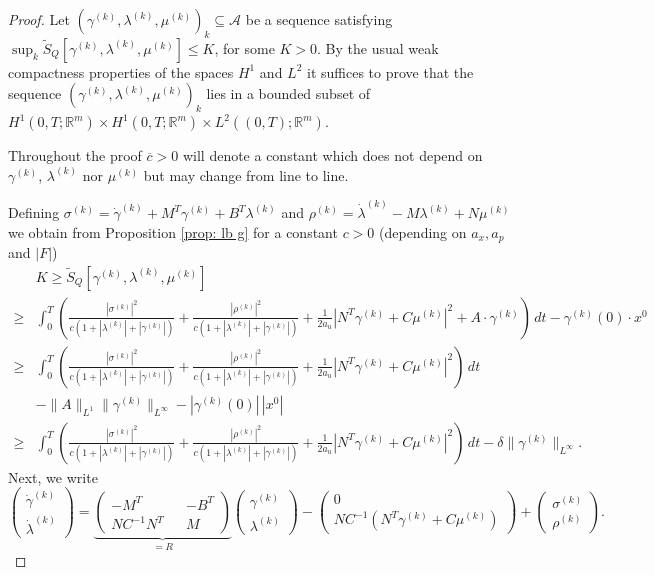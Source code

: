 \documentclass[11pt]{article}
\newcommand{\R}{\mathbb R}
\begin{document}
\begin{proof}
Let $(\gamma^{(k)},\lambda^{(k)}, \mu^{(k)})_k \subseteq \mathcal{A}$ be a sequence satisfying $\sup_k \tilde{S}_Q[\gamma^{(k)},\lambda^{(k)}, \mu^{(k)}] \leq K$, for some $K>0$.
By the usual weak compactness properties of the spaces $H^1$ and $L^2$ it suffices to prove that the sequence $(\gamma^{(k)},\lambda^{(k)}, \mu^{(k)})_k$ lies in a bounded subset of $H^1(0,T; \R^m) \times H^1(0,T; \R^m) \times L^2((0,T); \R^m)$.

Throughout the proof $\overline{c}>0$ will denote a constant which does not depend on $\gamma^{(k)}$, $\lambda^{(k)}$ nor $\mu^{(k)}$ but may change from line to line.

Defining $\sigma^{(k)} = \dot{\gamma}^{(k)} + M^T\gamma^{(k)} + B^T \lambda^{(k)}$ and $\rho^{(k)} = \dot{\lambda}^{(k)} - M \lambda^{(k)}  + N \mu^{(k)}$ we obtain from Proposition \ref{prop: lb g} for a constant $c>0$ (depending on $a_x, a_p$ and $|F|$)
\begin{align}
&K \geq \tilde{S}_Q[\gamma^{(k)},\lambda^{(k)}, \mu^{(k)}]  \label{eq: est coer dual} \\
\geq &\int_0^T \left( \frac{|\sigma^{(k)}|^2}{c(1 + |\lambda^{(k)}| + |\gamma^{(k)}|)} + \frac{|\rho^{(k)} |^2}{c(1 + |\lambda^{(k)}| + |\gamma^{(k)}|)} + \frac1{2a_u} |N^T\gamma^{(k)} + C \mu^{(k)}|^2 + A\cdot \gamma^{(k)} \right)  \, dt - \gamma^{(k)}(0)\cdot x^0 \nonumber \\
\geq &\int_0^T \left( \frac{|\sigma^{(k)}|^2}{c(1 + |\lambda^{(k)}| +  |\gamma^{(k)}|)} + \frac{|\rho^{(k)} |^2}{c(1 + |\lambda^{(k)}| + |\gamma^{(k)}|)} + \frac1{2a_u} |N^T\gamma^{(k)} + C \mu^{(k)}|^2 \right)  \, dt \nonumber  \\
& - \|A\|_{L^1} \| \gamma^{(k)}\|_{L^{\infty}} - |\gamma^{(k)}(0)| \, |x^0| \nonumber \\
\geq &\int_0^T \left( \frac{|\sigma^{(k)}|^2}{c(1 + |\lambda^{(k)}| +  |\gamma^{(k)}|)} + \frac{|\rho^{(k)} |^2}{c(1 + |\lambda^{(k)}| +  |\gamma^{(k)}|)} + \frac1{2a_u} |N^T\gamma^{(k)} + C \mu^{(k)}|^2 \right)  \, dt - \delta \| \gamma^{(k)} \|_{L^{\infty}}. \nonumber
\end{align}
Next, we write
\begin{equation}\label{eq: rep derivative}
\begin{pmatrix}
    \dot{\gamma}^{(k)} \\ \dot{\lambda}^{(k)}
\end{pmatrix} = \underbrace{\begin{pmatrix} -M^T && - B^T \\ N C^{-1}N^T &&  M \end{pmatrix}}_{= R} \begin{pmatrix} \gamma^{(k)} \\ \lambda^{(k)} \end{pmatrix} - \begin{pmatrix} 0 \\ N C^{-1} ( N^T\gamma^{(k)} + C\mu^{(k)}) \end{pmatrix} +  \begin{pmatrix} \sigma^{(k)} \\ \rho^{(k)} \end{pmatrix}.

\end{equation}
\end{proof}
\end{document}
